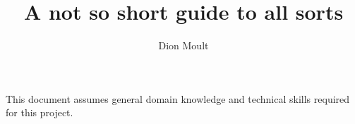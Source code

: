 \documentclass{article}
\author{Dion Moult}
\title{A not so short guide to all sorts}
\begin{document}
\maketitle
This document assumes general domain knowledge and technical skills required for this project.




\end{document}
